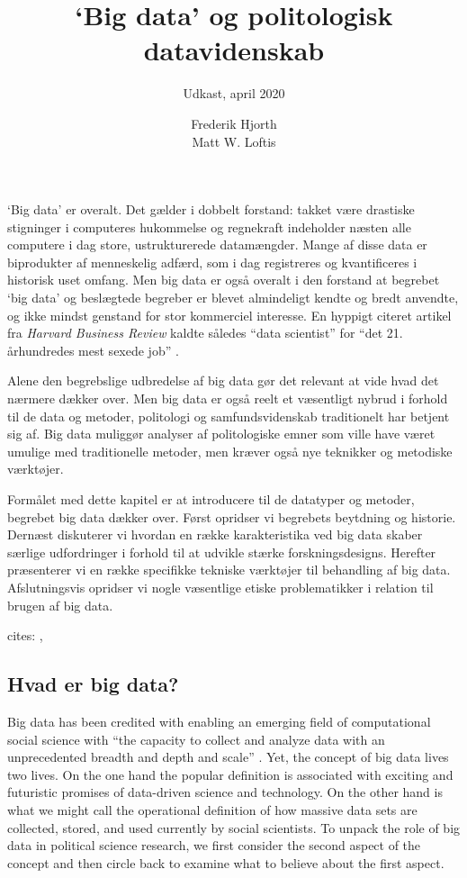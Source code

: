 \documentclass[12pt,]{article}
\title{`Big data' og politologisk datavidenskab}
\subtitle{Udkast, april 2020}
\author{Frederik Hjorth \\ Matt W. Loftis}
\date{}
\begin{document}
\maketitle

`Big data' er overalt. Det gælder i dobbelt forstand: takket være
drastiske stigninger i computeres hukommelse og regnekraft indeholder
næsten alle computere i dag store, ustrukturerede datamængder. Mange af
disse data er biprodukter af menneskelig adfærd, som i dag registreres
og kvantificeres i historisk uset omfang. Men big data er også overalt i
den forstand at begrebet `big data' og beslægtede begreber er blevet
almindeligt kendte og bredt anvendte, og ikke mindst genstand for stor
kommerciel interesse. En hyppigt citeret artikel fra \emph{Harvard
Business Review} kaldte således ``data scientist'' for ``det 21.
århundredes mest sexede job'' \citep{davenport2012data}.

Alene den begrebslige udbredelse af big data gør det relevant at vide
hvad det nærmere dækker over. Men big data er også reelt et væsentligt
nybrud i forhold til de data og metoder, politologi og samfundsvidenskab
traditionelt har betjent sig af. Big data muliggør analyser af
politologiske emner som ville have været umulige med traditionelle
metoder, men kræver også nye teknikker og metodiske værktøjer.

Formålet med dette kapitel er at introducere til de datatyper og
metoder, begrebet big data dækker over. Først opridser vi begrebets
beytdning og historie. Dernæst diskuterer vi hvordan en række
karakteristika ved big data skaber særlige udfordringer i forhold til at
udvikle stærke forskningsdesigns. Herefter præsenterer vi en række
specifikke tekniske værktøjer til behandling af big data. Afslutningsvis
opridser vi nogle væsentlige etiske problematikker i relation til brugen
af big data.

cites: \citet{mullainathan2017machine}, \citet{varian2014big}

\hypertarget{hvad-er-big-data}{%
\subsection{Hvad er big data?}\label{hvad-er-big-data}}

Big data has been credited with enabling an emerging field of
computational social science with ``the capacity to collect and analyze
data with an unprecedented breadth and depth and scale''
\citep{lazeretal}. Yet, the concept of big data lives two lives. On the
one hand the popular definition is associated with exciting and
futuristic promises of data-driven science and technology. On the other
hand is what we might call the operational definition of how massive
data sets are collected, stored, and used currently by social
scientists. To unpack the role of big data in political science
research, we first consider the second aspect of the concept and then
circle back to examine what to believe about the first aspect.
\end{document}
